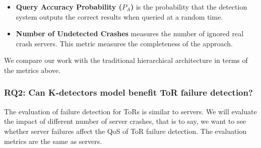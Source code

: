 \documentclass{sig-alternate-05-2015}
\begin{document}
\begin{itemize}
  \item \textbf{Query Accuracy Probability ($P_A$)} is the probability that the detection system outputs the correct results when queried at a random time.

  \item \textbf{Number of Undetected Crashes} measures the number of ignored real crash servers. This metric measures the completeness of the approach.
\end{itemize}

We compare our work with the traditional hierarchical architecture \cite{felber1999failure} in terms of the metrics above.

\subsubsection*{RQ2: Can K-detectors model benefit ToR failure detection?}
\quad The evaluation of failure detection for ToRs is similar to servers. We will evaluate the impact of different number of server crashes, that is to say, we want to see whether server failures affect the QoS of ToR failure detection. The evaluation metrics are the same as servers.
\end{document}
